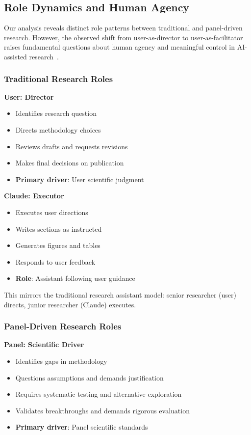 \subsection{Role Dynamics and Human Agency}

Our analysis reveals distinct role patterns between traditional and panel-driven research. However, the observed shift from user-as-director to user-as-facilitator raises fundamental questions about human agency and meaningful control in AI-assisted research~\cite{shneiderman2022human}.

\subsubsection{Traditional Research Roles}

\textbf{User: Director}
\begin{itemize}[leftmargin=*]
\item Identifies research question
\item Directs methodology choices
\item Reviews drafts and requests revisions
\item Makes final decisions on publication
\item \textbf{Primary driver}: User scientific judgment
\end{itemize}

\textbf{Claude: Executor}
\begin{itemize}[leftmargin=*]
\item Executes user directions
\item Writes sections as instructed
\item Generates figures and tables
\item Responds to user feedback
\item \textbf{Role}: Assistant following user guidance
\end{itemize}

This mirrors the traditional research assistant model: senior researcher (user) directs, junior researcher (Claude) executes.

\subsubsection{Panel-Driven Research Roles}

\textbf{Panel: Scientific Driver}
\begin{itemize}[leftmargin=*]
\item Identifies gaps in methodology
\item Questions assumptions and demands justification
\item Requires systematic testing and alternative exploration
\item Validates breakthroughs and demands rigorous evaluation
\item \textbf{Primary driver}: Panel scientific standards
\end{itemize}

